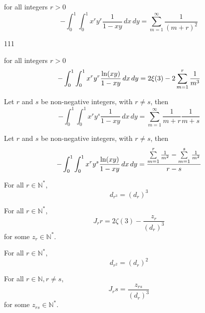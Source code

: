 \begin{lemma}\label{I_rr}
    for all integers $r > 0$
    \[ -\int_{0}^{1}\int_{0}^{1} x^ry^r\frac{1}{1-xy} \, dx \, dy = \sum\limits_{m = 1}^{\infty}\frac{1}{(m+r)^2} \]
\end{lemma}

\begin{lemma}\label{interchange_of_limits_sums_derivatives}
    111
\end{lemma}

\begin{lemma}\label{J_rr}
    for all integers $r > 0$
    \[ -\int_{0}^{1}\int_{0}^{1} x^ry^r\frac{{\rm ln}(xy)}{1-xy} \, dx \, dy = 2\xi(3) - 2 \sum\limits_{m = 1}^{r}\frac{1}{m^3} \]
\end{lemma}

\begin{lemma}\label{I_rs}
    Let $r$ and $s$ be non-negative integers, with $r \neq s$, then
    \[ -\int_{0}^{1}\int_{0}^{1} x^ry^s\frac{1}{1-xy} \, dx \, dy = \sum\limits_{m = 1}^{\infty}\frac{1}{m+r}\frac{1}{m+s} \]
\end{lemma}

\begin{lemma}\label{J_rs}
    Let $r$ and $s$ be non-negative integers, with $r \neq s$, then
    \[ -\int_{0}^{1}\int_{0}^{1} x^ry^s\frac{{\rm ln}(xy)}{1-xy} \, dx \, dy = \frac{\sum\limits_{m = 1}^{r}\frac{1}{m^2} - \sum\limits_{m = 1}^{s}\frac{1}{m^2}}{r - s} \]
\end{lemma}

\begin{lemma}\label{d_r_3}
    For all $r \in \mathbb{N}^*$,
    \[ d_{r^3} = (d_r)^3 \]
\end{lemma}

\begin{lemma}\label{Jrr_linear_form}
    For all $r \in \mathbb{N}^*$,
    \[ J_rr = 2 \zeta(3) - \frac{z_r}{(d_r)^3} \]
    for some $z_r \in \mathbb{N}^*$.
\end{lemma}

\begin{lemma}\label{d_r_2}
    For all $r \in \mathbb{N}^*$,
    \[ d_{r^2} = (d_r)^2 \]
\end{lemma}

\begin{lemma}\label{Jrs_postive_rational}
    For all $r \in \mathbb{N}, r \neq s$,
    \[ J_rs = \frac{z_{rs}}{(d_r)^3}\]
    for some $z_{rs} \in \mathbb{N}^*$.
\end{lemma}

